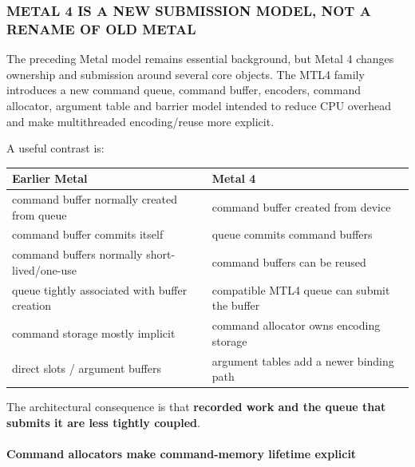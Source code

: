 \subsubsection{METAL 4 IS A NEW SUBMISSION MODEL, NOT A RENAME OF OLD METAL}\label{metal-4-is-a-new-submission-model-not-a-rename-of-old-metal}

The preceding Metal model remains essential background, but Metal 4 changes ownership and submission around several core objects. The MTL4 family introduces a new command queue, command buffer, encoders, command allocator, argument table and barrier model intended to reduce CPU overhead and make multithreaded encoding/reuse more explicit.

A useful contrast is:

{\def\LTcaptype{none} %
\begin{longtable}[]{@{}
  >{\raggedright\arraybackslash}p{}
  >{\raggedright\arraybackslash}p{}@{}}
\toprule\noalign{}
\begin{minipage}[b]{\linewidth}\raggedright
Earlier Metal
\end{minipage} & \begin{minipage}[b]{\linewidth}\raggedright
Metal 4
\end{minipage} \\
\midrule\noalign{}
\endhead
\bottomrule\noalign{}
\endlastfoot
command buffer normally created from queue & command buffer created from device \\
command buffer commits itself & queue commits command buffers \\
command buffers normally short-lived/one-use & command buffers can be reused \\
queue tightly associated with buffer creation & compatible MTL4 queue can submit the buffer \\
command storage mostly implicit & command allocator owns encoding storage \\
direct slots / argument buffers & argument tables add a newer binding path \\
\end{longtable}
}

The architectural consequence is that \textbf{recorded work and the queue that submits it are less tightly coupled}.

\paragraph{Command allocators make command-memory lifetime explicit}\label{command-allocators-make-command-memory-lifetime-explicit}

